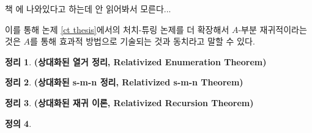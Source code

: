 \documentclass[b5paper, 11pt]{book}
\theoremstyle{definition}
\newtheorem{defn}{정의}[chapter]
\newtheorem{thm}[defn]{정리}
\newenvironment{pf*}{\pushQED{\qed}\pf}
{\popQED\endpf}
\begin{document}
\begin{pf*}
    책 \cite{kleene1952introduction}에 나와있다고 하는데 안 읽어봐서 모른다...
\end{pf*}
이를 통해 논제 \ref{ct thesis}에서의 처치-튜링 논제를 더 확장해서 $A$-부분 재귀적이라는 것은 $A$를 통해 효과적 방법으로 기술되는 것과 동치라고 말할 수 있다.
\begin{thm}
    \textbf{(상대화된 열거 정리, Relativized Enumeration Theorem)}
\end{thm}
\begin{thm}
    \textbf{(상대화된 s-m-n 정리, Relativized s-m-n Theorem)}
\end{thm}
\begin{thm}
    \textbf{(상대화된 재귀 이론, Relativized Recursion Theorem)}
\end{thm}
\begin{defn}
    
\end{defn}
\end{document}
